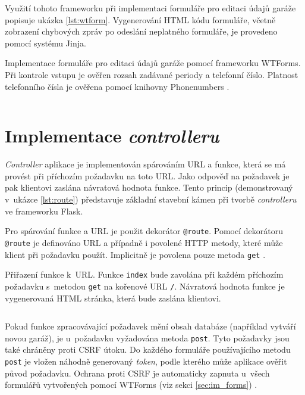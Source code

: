 Využití tohoto frameworku při implementaci formuláře pro editaci údajů garáže popisuje ukázka \ref{lst:wtform}. Vygenerování HTML kódu formuláře, včetně zobrazení chybových zpráv po odeslání neplatného formuláře, je provedeno pomocí systému Jinja.

\begin{listing}[htbp]
\caption{\label{lst:wtform} Implementace formuláře pro editaci údajů garáže pomocí frameworku WTForms. Při kontrole vstupu je ověřen rozsah zadávané periody a telefonní číslo. Platnost telefonního čísla je ověřena pomocí knihovny Phonenumbers \cite{phonenumbers}.}
\inputminted[bgcolor=codebg]{python}{source-samples/wtform.py}
\end{listing}

\section{Implementace \textit{controlleru}}
\label{sec:im_controller}

\textit{Controller} aplikace je implementován spárováním URL a funkce, která se má provést při příchozím požadavku na toto URL. Jako odpověď na požadavek je pak klientovi zaslána návratová hodnota funkce. Tento princip (demonstrovaný v~ukázce \ref{lst:route}) představuje základní stavební kámen při tvorbě \textit{controlleru} ve frameworku Flask.

Pro spárování funkce a URL je použit dekorátor \texttt{@route}. Pomocí dekorátoru \texttt{@route} je definováno URL a případně i povolené HTTP metody, které může klient při požadavku použít. Implicitně je povolena pouze metoda \texttt{get} \cite{flask_api}. 

\begin{listing}[htbp]
\caption{\label{lst:route} Přiřazení funkce k~URL. Funkce \texttt{index} bude zavolána při každém příchozím požadavku s~metodou \texttt{get} na kořenové URL \texttt{/}. Návratová hodnota funkce je vygenerovaná HTML stránka, která bude zaslána klientovi.}
\inputminted[bgcolor=codebg]{python}{source-samples/route.py}
\end{listing}

Pokud funkce zpracovávající požadavek mění obsah databáze (například vytváří novou garáž), je u~požadavku vyžadována metoda \texttt{post}. Tyto požadavky jsou také chráněny proti CSRF útoku. Do každého formuláře používajícího metodu \texttt{post} je vložen náhodně generovaný \textit{token}, podle kterého může aplikace ověřit původ požadavku. Ochrana proti CSRF je automaticky zapnuta u~všech formulářů vytvořených pomocí WTForms (viz sekci \ref{sec:im_forms}) \cite{flask_wtf}.


